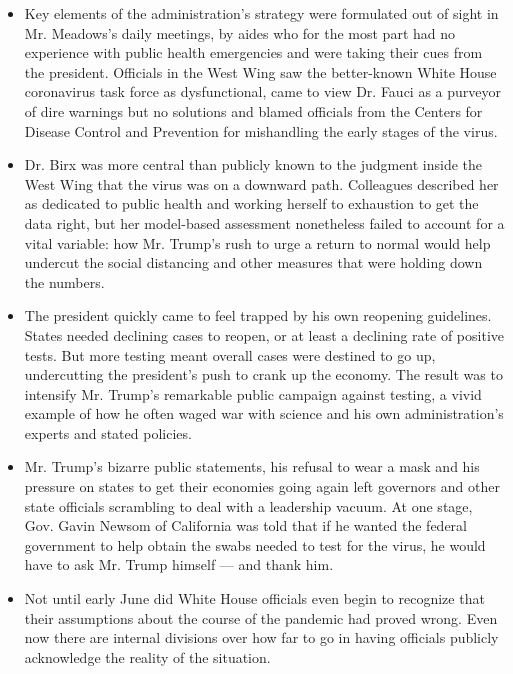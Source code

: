 \begin{itemize}
\item
  Key elements of the administration's strategy were formulated out of
  sight in Mr. Meadows's daily meetings, by aides who for the most part
  had no experience with public health emergencies and were taking their
  cues from the president. Officials in the West Wing saw the
  better-known White House coronavirus task force as dysfunctional, came
  to view Dr. Fauci as a purveyor of dire warnings but no solutions and
  blamed officials from the Centers for Disease Control and Prevention
  for mishandling the early stages of the virus.
\item
  Dr. Birx was more central than publicly known to the judgment inside
  the West Wing that the virus was on a downward path. Colleagues
  described her as dedicated to public health and working herself to
  exhaustion to get the data right, but her model-based assessment
  nonetheless failed to account for a vital variable: how Mr. Trump's
  rush to urge a return to normal would help undercut the social
  distancing and other measures that were holding down the numbers.
\item
  The president quickly came to feel trapped by his own reopening
  guidelines. States needed declining cases to reopen, or at least a
  declining rate of positive tests. But more testing meant overall cases
  were destined to go up, undercutting the president's push to crank up
  the economy. The result was to intensify Mr. Trump's remarkable public
  campaign against testing, a vivid example of how he often waged war
  with science and his own administration's experts and stated policies.
\item
  Mr. Trump's bizarre public statements, his refusal to wear a mask and
  his pressure on states to get their economies going again left
  governors and other state officials scrambling to deal with a
  leadership vacuum. At one stage, Gov. Gavin Newsom of California was
  told that if he wanted the federal government to help obtain the swabs
  needed to test for the virus, he would have to ask Mr. Trump himself
  --- and thank him.
\item
  Not until early June did White House officials even begin to recognize
  that their assumptions about the course of the pandemic had proved
  wrong. Even now there are internal divisions over how far to go in
  having officials publicly acknowledge the reality of the situation.
\end{itemize}

